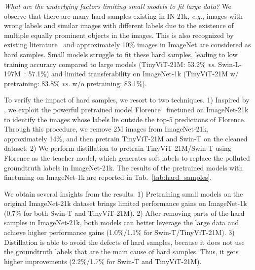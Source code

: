 \documentclass[runningheads]{llncs}
\begin{document}
\textit{What are the underlying factors limiting small models to fit large data?} We observe that there are many hard samples existing in IN-21k, \emph{e.g.}, images with wrong labels and similar images with different labels due to the existence of multiple equally prominent objects in the images. This is also recognized by existing literature~\cite{relabel,imagenet_real,ridnik2021imagenet} and approximately 10\% images in ImageNet are considered as hard samples. Small models struggle to fit these hard samples, leading to low training accuracy compared to large models (TinyViT-21M: 53.2\% \emph{vs.} Swin-L-197M~\cite{swin}: 57.1\%) and limited transferability on ImageNet-1k
(TinyViT-21M w/ pretraining: 83.8\% \emph{vs.} w/o pretraining: 83.1\%).

To verify the impact of hard samples, we resort to two techniques. 1) Inspired by \cite{imagenet_real}, we exploit the powerful pretrained model Florence~\cite{florence} finetuned on ImageNet-21k to identify the images whose labels lie outside the top-5 predictions of Florence. Through this procedure, we remove 2M images from ImageNet-21k, approximately 14\%, and then pretrain TinyViT-21M and Swin-T on the cleaned dataset. 
2) We perform distillation to pretrain TinyViT-21M/Swin-T using Florence as the teacher model, which generates soft labels to replace the polluted groundtruth labels in ImageNet-21k. The results of the pretrained models with finetuning on ImageNet-1k are reported in Tab.~\ref{tab:hard_samples}.

We obtain several insights from the results. 1) Pretraining small models on the original ImageNet-21k dataset brings limited performance gains on ImageNet-1k (0.7\% for both Swin-T and TinyViT-21M). 2) After removing parts of the hard samples in ImageNet-21k, both models can better leverage the large data and achieve higher performance gains (1.0\%/1.1\% for Swin-T/TinyViT-21M). 3) Distillation is able to avoid the defects of hard samples, because it does not use the groundtruth labels that are the main cause of hard samples. Thus, it gets higher improvements (2.2\%/1.7\% for Swin-T and TinyViT-21M). 
\end{document}
